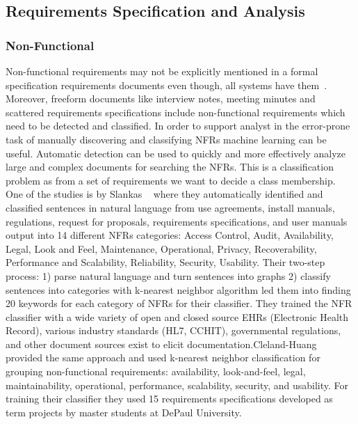 \subsection{Requirements Specification and Analysis}

\subsubsection{Non-Functional}

Non-functional requirements may not be explicitly mentioned in a formal
specification requirements documents even though, all systems have
them~\cite{Slankas:2013}. Moreover, freeform documents like interview notes,
meeting minutes and scattered requirements specifications include non-functional
requirements which need to be detected and classified. In order to support
analyst in the error-prone task of manually discovering and classifying NFRs
machine learning can be useful. Automatic detection can be used to quickly and
more effectively analyze large and complex documents for searching the
NFRs\cite{Cleland-Huang2007}. This is a classification problem as from a set of
requirements we want to decide a class membership. \\

One of the studies is by Slankas \etal~\cite{Slankas:2013} where they
automatically identified and classified sentences in natural language from use
agreements, install manuals, regulations, request for proposals, requirements
specifications, and user manuals output into 14 different NFRs categories:
Access Control, Audit, Availability, Legal, Look and Feel, Maintenance, Operational, Privacy, Recoverability,
Performance and Scalability, Reliability, Security, Usability.
Their two-step process:
1) parse natural language and turn sentences into graphs 2) classify sentences into categories with k-nearest neighbor algorithm
led them into finding 20 keywords for each category of NFRs for their
classifier. They trained the NFR classifier with a wide variety of open and
closed source EHRs (Electronic Health Record), various industry standards (HL7,
CCHIT), governmental regulations, and other document sources exist to elicit
documentation.\newline Cleland-Huang \etal~\cite{Cleland-Huang2007} provided the
same approach and used k-nearest neighbor classification for grouping
non-functional requirements: availability, look-and-feel, legal,
maintainability, operational, performance, scalability, security, and usability.
For training their classifier they used 15 requirements specifications developed
as term projects by master students at DePaul University.

